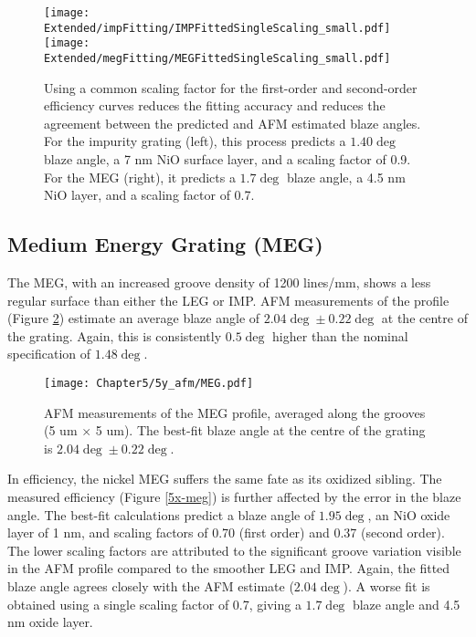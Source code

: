 \begin{figure}[htbp] %
   \centering
   \texttt{[image: Extended/impFitting/IMPFittedSingleScaling\_small.pdf]} 
     \texttt{[image: Extended/megFitting/MEGFittedSingleScaling\_small.pdf]} 
   \caption{Using a common scaling factor for the first-order and second-order efficiency curves reduces the fitting accuracy and reduces the agreement between the predicted and AFM estimated blaze angles.  For the impurity grating (left), this process predicts a $1.40\deg$ blaze angle, a 7 nm NiO surface layer, and a scaling factor of 0.9.  For the MEG (right), it predicts a $1.7\deg$ blaze angle, a 4.5 nm NiO layer, and a scaling factor of 0.7.}
   \label{singleScalingFit}
\end{figure}

\subsection{Medium Energy Grating (MEG)}
The MEG, with an increased groove density of 1200 lines/mm, shows a less regular surface than either the LEG or IMP.  AFM measurements of the profile (Figure \ref{5y-meg}) estimate an average blaze angle of $2.04\deg \pm 0.22\deg$ at the centre of the grating.  Again, this is consistently $0.5\deg$ higher than the nominal specification of $1.48\deg$.

\begin{figure}[htbp] %
   \centering
   \texttt{[image: Chapter5/5y\_afm/MEG.pdf]} 
   \caption{AFM measurements of the MEG profile, averaged along the grooves (5 um $\times$ 5 um).  The best-fit blaze angle at the centre of the grating is $2.04\deg \pm 0.22\deg$.}
   \label{5y-meg}
\end{figure}

In efficiency, the nickel MEG suffers the same fate as its oxidized sibling.  The measured efficiency (Figure \ref{5x-meg}) is further affected by the error in the blaze angle.  The best-fit calculations predict a blaze angle of $1.95\deg$, an NiO oxide layer of 1 nm, and scaling factors of 0.70 (first order) and 0.37 (second order).  The lower scaling factors are attributed to the significant groove variation visible in the AFM profile compared to the smoother LEG and IMP.  Again, the fitted blaze angle agrees closely with the AFM estimate ($2.04\deg$).  A worse fit is obtained using a single scaling factor of 0.7, giving a $1.7\deg$ blaze angle and 4.5 nm oxide layer.


